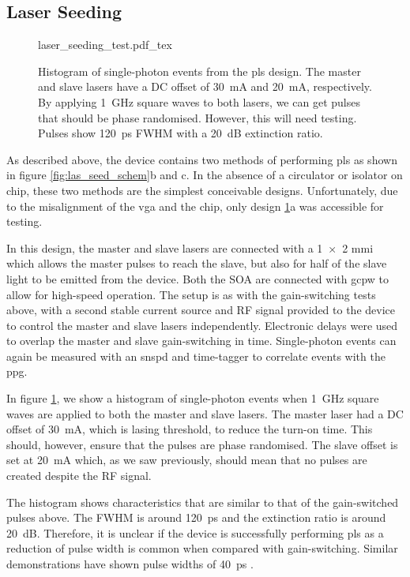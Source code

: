 \subsection{Laser Seeding}

\begin{figure}[tp]
	\centering	
	\def\svgwidth{0.9\textwidth} 
	{laser_seeding_test.pdf_tex}
	\caption[Integrated laser seeding test histogram]{Histogram of single-photon events from the \acs{pls} design. The master and slave lasers have a DC offset of \SI{30}{\mA} and \SI{20}{\mA}, respectively. By applying \SI{1}{GHz} square waves to both lasers, we can get pulses that should be phase randomised. However,  this will need testing. Pulses show \SI{120}{ps} \acs{FWHM} with a \SI{20}{dB} extinction ratio.}
	\label{fig:las_seed_test}
\end{figure}

As described above, the device contains two methods of performing \ac{pls} as shown in figure \ref{fig:las_seed_schem}b and c. In the absence of a circulator or isolator on chip, these two methods are the simplest conceivable designs. Unfortunately, due to the misalignment of the \ac{vga} and the chip, only design \ref{fig:las_seed_test}a was accessible for testing. 

In this design, the master and slave lasers are connected with a \num{1x2} \ac{mmi} which allows the master pulses to reach the slave, but also for half of the slave light to be emitted from the device. Both the \ac{SOA} are connected with \ac{gcpw} to allow for high-speed operation. The setup is as with the gain-switching tests above, with a second stable current source and RF signal provided to the device to control the master and slave lasers independently. Electronic delays were used to overlap the master and slave gain-switching in time. Single-photon events can again be measured with an \ac{snspd} and time-tagger to correlate events with the \ac{ppg}.

In figure \ref{fig:las_seed_test}, we show a histogram of single-photon events when \SI{1}{GHz} square waves are applied to both the master and slave lasers. The master laser had a DC offset of \SI{30}{\mA}, which is lasing threshold, to reduce the turn-on time. This should, however, ensure that the pulses are phase randomised. The slave offset is set at \SI{20}{\mA} which, as we saw previously, should mean that no pulses are created despite the RF signal. 

The histogram shows characteristics that are similar to that of the gain-switched pulses above. The \ac{FWHM} is around \SI{120}{ps} and the extinction ratio is around \SI{20}{dB}. Therefore, it is unclear if the device is successfully performing \ac{pls} as a reduction of pulse width is common when compared with gain-switching. Similar demonstrations have shown pulse widths of \SI{40}{ps} \cite{paraiso2019, Comandar2016PLS}.

